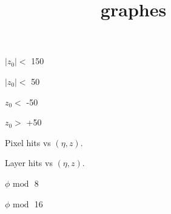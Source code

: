 \documentclass[11pt]{article} %
\title{graphes}
\date{} %
\begin{document}
\maketitle

\begin{figure}[H]
\centering
 \resizebox{.8\linewidth}{!}{}
 \caption{$|z_0| <$ 150}
\end{figure}

\begin{figure}[H]
\centering
 \resizebox{.8\linewidth}{!}{}
 \caption{$|z_0| <$ 50}
\end{figure}

\begin{figure}[H]
\centering
 \resizebox{.8\linewidth}{!}{}
  \caption{$z_0 <$ -50}
\end{figure}

\begin{figure}[H]
\centering
 \resizebox{.8\linewidth}{!}{}
  \caption{$z_0 >$ +50}
\end{figure}

\begin{figure}[H]
\centering
\begin{subfigure}[b]{.5\linewidth}
 \resizebox{1.1\linewidth}{!}{}
\end{subfigure}%
\begin{subfigure}[b]{.5\linewidth}
\raggedright
 \resizebox{1.1\linewidth}{!}{}
\end{subfigure}
\caption{Pixel hits vs $(\eta, z)$.}
\end{figure}

\begin{figure}[H]
\centering
\begin{subfigure}[b]{.5\linewidth}
 \resizebox{1.1\linewidth}{!}{}
\end{subfigure}%
\begin{subfigure}[b]{.5\linewidth}
\raggedright
 \resizebox{1.1\linewidth}{!}{}
\end{subfigure}
\caption{Layer hits vs $(\eta, z)$.}
\end{figure}

\begin{figure}[H]
\centering
 \resizebox{.8\linewidth}{!}{}
  \caption{$\phi \textrm{ mod }$ 8}
\end{figure}

\begin{figure}[H]
\centering
 \resizebox{.8\linewidth}{!}{}
  \caption{$\phi \textrm{ mod }$ 16}
\end{figure}
\end{document}
